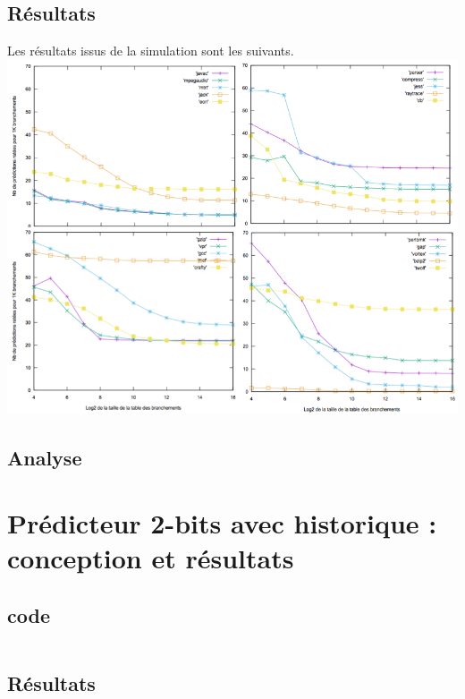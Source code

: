 \documentclass[a4paper]{article}
\begin{document}
\subsection{Résultats}

Les résultats issus de la simulation sont les suivants.
\includegraphics[width=\linewidth]{2-bit.png}

\subsection{Analyse}

\section{Prédicteur 2-bits avec historique : conception et résultats}
\subsection{code}

\small
\begin{verbatim}
\end{verbatim}
\normalsize

\subsection{Résultats}
\end{document}
